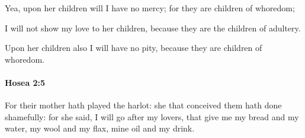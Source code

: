 			\begin{versebox}
					\item[BHS] 
					\item[LXX] 
					\item[ASV] Yea, upon her children will I have no mercy; for they are children of whoredom;
					\item[NIV] I will not show my love to her children, because they are the children of adultery.
					\item[NRSV] Upon her children also I will have no pity, because they are children of whoredom.
			\end{versebox}

		\paragraph{Hosea 2:5} %
			\label{HOSEA-2-5}

			For their mother hath played the harlot: she that conceived them hath done shamefully: for she said, I will go after my lovers, that give me my bread and my water, my wool and my flax, mine oil and my drink.

